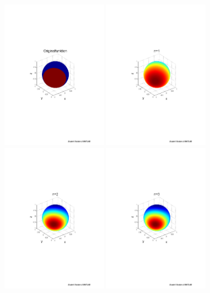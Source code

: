 \begin{refsection}
\begin{figure}%
\centering
\includegraphics[width=0.4\textwidth]{kugel/Gibbs/GibbsOriginalFunktion.pdf}
\includegraphics[width=0.4\textwidth]{kugel/Gibbs/GibbsN_1.pdf}
\includegraphics[width=0.4\textwidth]{kugel/Gibbs/GibbsN_2.pdf}
\includegraphics[width=0.4\textwidth]{kugel/Gibbs/GibbsN_3.pdf}

\end{figure}
\end{refsection}
